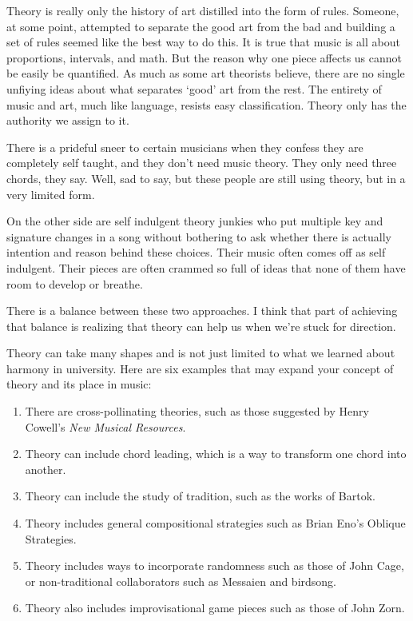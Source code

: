 \documentclass[
]{book}
\providecommand{\tightlist}{%
  \setlength{\itemsep}{0pt}\setlength{\parskip}{0pt}}
\begin{document}
Theory is really only the history of art distilled into the form of rules. Someone, at some point, attempted to separate the good art from the bad and building a set of rules seemed like the best way to do this. It is true that music is all about proportions, intervals, and math. But the reason why one piece affects us cannot be easily be quantified. As much as some art theorists believe, there are no single unfiying ideas about what separates `good' art from the rest. The entirety of music and art, much like language, resists easy classification. Theory only has the authority we assign to it.

There is a prideful sneer to certain musicians when they confess they are completely self taught, and they don't need music theory. They only need three chords, they say. Well, sad to say, but these people are still using theory, but in a very limited form.

On the other side are self indulgent theory junkies who put multiple key and signature changes in a song without bothering to ask whether there is actually intention and reason behind these choices. Their music often comes off as self indulgent. Their pieces are often crammed so full of ideas that none of them have room to develop or breathe.

There is a balance between these two approaches. I think that part of achieving that balance is realizing that theory can help us when we're stuck for direction.

Theory can take many shapes and is not just limited to what we learned about harmony in university. Here are six examples that may expand your concept of theory and its place in music:

\begin{enumerate}
\def\labelenumi{\arabic{enumi}.}
\tightlist
\item
  There are cross-pollinating theories, such as those suggested by Henry Cowell's \emph{New Musical Resources}.
\item
  Theory can include chord leading, which is a way to transform one chord into another.
\item
  Theory can include the study of tradition, such as the works of Bartok.
\item
  Theory includes general compositional strategies such as Brian Eno's Oblique Strategies.
\item
  Theory includes ways to incorporate randomness such as those of John Cage, or non-traditional collaborators such as Messaien and birdsong.
\item
  Theory also includes improvisational game pieces such as those of John Zorn.
\end{enumerate}
\end{document}
